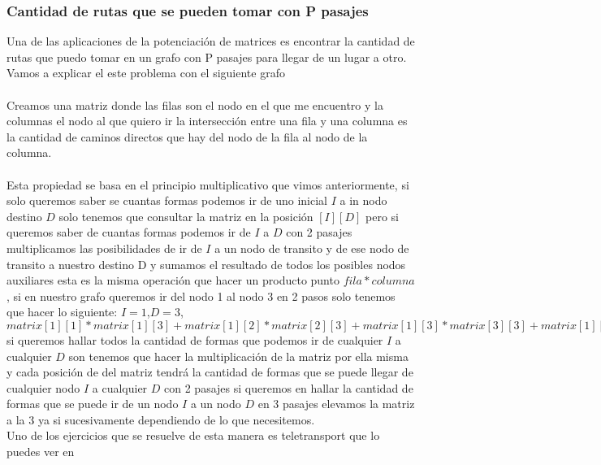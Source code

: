 \subsubsection{Cantidad de rutas que se pueden tomar con P pasajes}
Una de las aplicaciones de la potenciación de matrices es encontrar la cantidad de rutas que puedo
tomar en un grafo con P pasajes para llegar de un lugar a otro.
Vamos a explicar el este problema con el siguiente grafo
\\
\\Creamos una matriz donde las filas son el nodo en el que me encuentro y la columnas el nodo al que quiero ir la intersección entre una fila y una columna es la cantidad de caminos directos que hay del nodo de la fila al nodo de la columna.
\\
\\Esta propiedad se basa en el principio multiplicativo que vimos anteriormente, si solo queremos saber se cuantas formas podemos ir de uno inicial $I$ a in nodo destino $D$ solo tenemos que consultar la matriz en la posición $[I][D]$ pero si queremos saber de cuantas formas podemos ir de $I$ a $D$ con 2 pasajes multiplicamos las posibilidades de ir de $I$ a un nodo de transito y de ese nodo de transito a nuestro destino D y sumamos el resultado de todos los posibles nodos auxiliares esta es la misma operación que hacer un producto punto $fila * columna$, si en nuestro grafo queremos ir del nodo 1 al nodo 3 en 2 pasos solo tenemos que hacer lo siguiente:
$I=1$,$D=3$, $matrix[1][1]*matrix[1][3]+matrix[1][2]*matrix[2][3]+matrix[1][3]*matrix[3][3]+matrix[1][4]*matrix[4][3]+matrix[1][5]*matrix[5][3]$
si queremos hallar todos la cantidad de formas que podemos ir de cualquier $I$ a cualquier $D$ son tenemos que hacer la multiplicación  de la matriz por ella misma y cada posición de del matriz tendrá la cantidad de formas que se puede llegar de cualquier nodo $I$ a cualquier $D$ con 2 pasajes
si queremos en hallar la cantidad de formas que se puede ir de un nodo $I$ a un nodo $D$ en 3 pasajes elevamos la matriz a la 3 ya si sucesivamente dependiendo de lo que necesitemos.
\\Uno de los ejercicios que se resuelve de esta manera es teletransport que lo puedes ver en \cite{Teletransport:Online}
